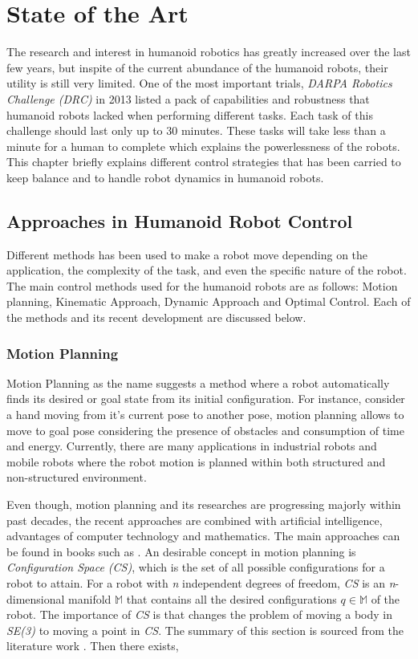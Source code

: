 \chapter{State of the Art}


The research and interest in humanoid robotics has greatly increased over the last few years, but inspite of the current
abundance of the humanoid robots, their utility is still very limited. One of the most important trials, \textit{DARPA 
Robotics Challenge (DRC)} in 2013 listed a pack of capabilities and robustness that humanoid robots lacked when performing 
different tasks. Each task of this challenge should last only up to 30 minutes. These tasks will take less than a minute 
for a human to complete which  explains the powerlessness of the robots. This chapter briefly explains different control 
strategies that has been carried to keep balance and to handle robot dynamics in humanoid robots.

\section{Approaches in Humanoid Robot Control}

Different methods has been used to make a robot move depending on the application, the complexity of the task, and even
the specific nature of the robot. The main control methods used for the humanoid robots are as follows: Motion planning,
Kinematic Approach, Dynamic Approach and Optimal Control. Each of the methods and its recent development are discussed
below.

\subsection{Motion Planning}

Motion Planning as the name suggests a method where a robot automatically finds its desired or goal state from its initial
configuration. For instance, consider a hand moving from it's current pose to another pose, motion planning allows to move to
goal pose considering the presence of obstacles and consumption of time and energy. Currently, there are many applications in 
industrial robots and mobile robots where the robot motion is planned within both structured and non-structured environment. 

 

Even though, motion planning and its researches are progressing majorly within past decades, the recent approaches are combined
with artificial intelligence, advantages of computer technology and mathematics. The main approaches can be found in books such as 
\cite{Latombe,LaValle2006PlanningA}. An desirable concept in motion planning is \textit{Configuration Space (CS)}, which is the set
of all possible configurations for a robot to attain. For a robot with \textit{n} independent degrees of freedom, \textit{CS} is an 
\textit{n}-dimensional manifold $\mathbb{M}$ that contains all the desired configurations $q \in \mathbb{M}$ of the robot. The importance
of \textit{CS} is that changes the problem of moving a body in \textit{SE(3)} to moving a point in \textit{CS}. The summary of this
section is sourced from the literature work \cite{ramosponce}. Then there exists,

